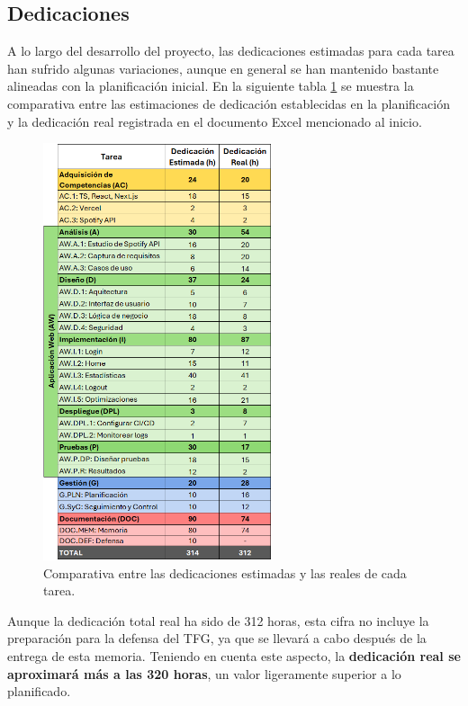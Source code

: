 \subsection{Dedicaciones}

A lo largo del desarrollo del proyecto, las dedicaciones estimadas para cada tarea han sufrido algunas variaciones, aunque en general se han mantenido bastante alineadas con la planificación inicial. En la siguiente tabla \ref{tab:dedicaciones_real} se muestra la comparativa entre las estimaciones de dedicación establecidas en la planificación y la dedicación real registrada en el documento Excel mencionado al inicio.

\begin{figure}[H]
    \centering
    \includegraphics[width=0.6\textwidth]{figures/syc/dedicaciones_real.png}
    \vspace{0.5cm}
    \caption{Comparativa entre las dedicaciones estimadas y las reales de cada tarea.}
    \label{tab:dedicaciones_real}
\end{figure}

Aunque la dedicación total real ha sido de 312 horas, esta cifra no incluye la preparación para la defensa del TFG, ya que se llevará a cabo después de la entrega de esta memoria. Teniendo en cuenta este aspecto, la \textbf{dedicación real se aproximará más a las 320 horas}, un valor ligeramente superior a lo planificado.

